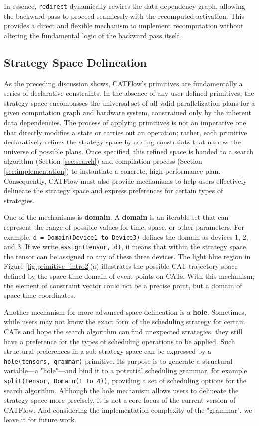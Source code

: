\documentclass[letterpaper,twocolumn,10pt]{article}
\newcommand{\name}{CATFlow}
\begin{document}
In essence, \texttt{redirect} dynamically rewires the data dependency graph, allowing the backward pass to proceed seamlessly with the recomputed activation. This provides a direct and flexible mechanism to implement recomputation without altering the fundamental logic of the backward pass itself.

\subsection{Strategy Space Delineation}

As the preceding discussion shows, \name{}'s primitives are fundamentally a series of declarative constraints. In the absence of any user-defined primitives, the strategy space encompasses the universal set of all valid parallelization plans for a given computation graph and hardware system, constrained only by the inherent data dependencies. The process of applying primitives is not an imperative one that directly modifies a state or carries out an operation; rather, each primitive declaratively refines the strategy space by adding constraints that narrow the universe of possible plans. Once specified, this refined space is handed to a search algorithm (Section \ref{sec:search}) and compilation process (Section \ref{sec:implementation}) to instantiate a concrete, high-performance plan. Consequently, \name{} must also provide mechanisms to help users effectively delineate the strategy space and express preferences for certain types of strategies.

One of the mechanisms is \textbf{domain}. A \textbf{domain} is an iterable set that can represent the range of possible values for time, space, or other parameters. For example, \texttt{d = Domain(Device1 to Device3)} defines the domain as devices 1, 2, and 3. If we write \texttt{assign(tensor, d)}, it means that within the strategy space, the tensor can be assigned to any of these three devices. The light blue region in Figure \ref{fig:primitive_intro2}(a) illustrates the possible CAT trajectory space defined by the space-time domain of event points on CATs. With this mechanism, the element of constraint vector could not be a precise point, but a domain of space-time coordinates.

Another mechanism for more advanced space delineation is a \textbf{hole}. Sometimes, while users may not know the exact form of the scheduling strategy for certain CATs and hope the search algorithm can find unexpected strategies, they still have a preference for the types of scheduling operations to be applied. Such structural preferences in a sub-strategy space can be expressed by a \texttt{hole(tensors, grammar)} primitive. Its purpose is to generate a structural variable—a "hole"—and bind it to a potential scheduling grammar, for example \texttt{split(tensor, Domain(1 to 4))}, providing a set of scheduling options for the search algorithm. Although the hole mechanism allows users to delineate the strategy space more precisely, it is not a core focus of the current version of \name{}. And considering the implementation complexity of the "grammar", we leave it for future work.
\end{document}
